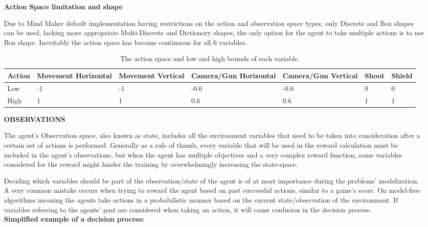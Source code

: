 \documentclass[a4paper,one side,12pt]{book}
\begin{document}
\textbf{Action Space limitation and shape}

Due to Mind Maker default implementation having restrictions on the
action and observation space types, only Discrete and Box shapes can be
used, lacking more appropriate Multi-Discrete and Dictionary shapes, the
only option for the agent to take multiple actions is to use Box shape.
Inevitably the action space has become continuous for all 6 variables.

\begin{table}[H]
    \centering  
    \begin{tabular}
    {|m{2.5em}||m{5em}||m{4em}||m{5em}||m{5em}||m{2.5em}||m{2.5em}|}
    \hline
         Action & Movement Horizontal & Movement Vertical	&Camera/Gun Horizontal & Camera/Gun Vertical & Shoot&Shield\\
    \hline    
    \hline       					
Low	&-1	&-1	&-0.6	&-0.6	&0	&0\\
\hline   
High	&1	&1	&0.6	&0.6	&1	&1\\

         \hline
    \end{tabular}
    \caption{The action space and low and high bounds
of each variable.}
\end{table} 

\textbf{OBSERVATIONS}

The agent's Observation space, also known as state, includes all the environment variables
that need to be taken into consideration after a certain set of actions
is performed. Generally as a rule of thumb, every variable that will be
used in the reward calculation must be included in the agent's
observations, but when the agent has multiple objectives and a very complex reward function, some
variables considered for the reward might hinder the training by overwhelmingly increasing the state-space.

Deciding which variables should be part of the observation/state of the agent is of at most importance 
during the problems' modelization. A very common mistake occurs when trying to reward the agent based on past successful
actions, similar to a game's score. On model-free algorithms meaning the agents 
take actions in a probabilistic manner based on the current state/observation of the environment. 
If variables referring to the agents' past are considered when taking an action, it will cause confusion 
in the decision process.\\

\textbf{Simplified example of a decision process:}
\end{document}
